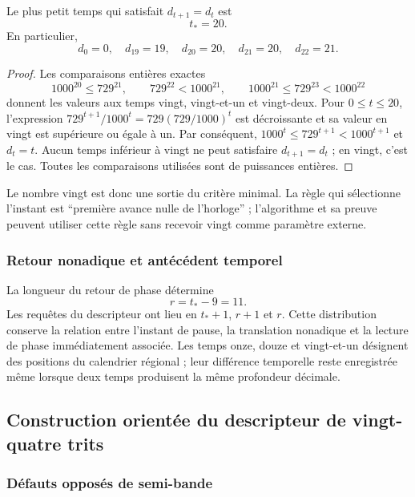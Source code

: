 \begin{proposition}
Le plus petit temps qui satisfait $d_{t+1}=d_t$ est
\[
 t_*=20.
\]
En particulier,
\[
 d_0=0,\quad d_{19}=19,\quad d_{20}=20,
 \quad d_{21}=20,\quad d_{22}=21.
\]
\end{proposition}
\begin{proof}
Les comparaisons entières exactes
\[
 1000^{20}\leq729^{21},\qquad
 729^{22}<1000^{21},\qquad
 1000^{21}\leq729^{23}<1000^{22}
\]
donnent les valeurs aux temps vingt, vingt-et-un et vingt-deux. Pour
$0\leq t\leq20$, l'expression
$729^{t+1}/1000^t=729(729/1000)^t$ est décroissante et sa valeur en vingt
est supérieure ou égale à un. Par conséquent,
$1000^t\leq729^{t+1}<1000^{t+1}$ et $d_t=t$. Aucun temps inférieur à
vingt ne peut satisfaire $d_{t+1}=d_t$ ; en vingt, c'est le cas.
Toutes les comparaisons utilisées sont de puissances entières.
\end{proof}

Le nombre vingt est donc une sortie du critère minimal. La règle qui sélectionne l'instant est ``première avance nulle de l'horloge'' ; l'algorithme et sa preuve peuvent utiliser cette règle sans recevoir vingt comme paramètre externe.

\subsubsection{Retour nonadique et antécédent temporel}

La longueur du retour de phase détermine
\begin{equation}
 r=t_*-9=11.
 \label{act21:eq:kdes-retorno}
\end{equation}
Les requêtes du descripteur ont lieu en $t_*+1$, $r+1$ et $r$.
Cette distribution conserve la relation entre l'instant de pause, la
translation nonadique et la lecture de phase immédiatement associée. Les
temps onze, douze et vingt-et-un désignent des positions du calendrier
régional ; leur différence temporelle reste enregistrée même lorsque deux
temps produisent la même profondeur décimale.

\subsection{Construction orientée du descripteur de vingt-quatre trits}

\subsubsection{Défauts opposés de semi-bande}

